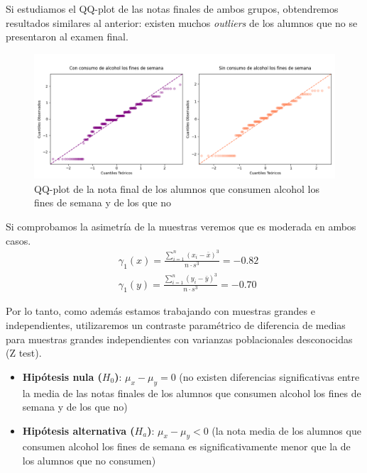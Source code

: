 Si estudiamos el QQ-plot de las notas finales de ambos grupos, obtendremos resultados similares al anterior: existen muchos \textit{outliers} de los alumnos que no se presentaron al examen final.
\begin{figure}[H]
    \begin{center}
        \includegraphics[width=1\textwidth]{figures/qq-plot-walc.png}
    \end{center}
    \caption{QQ-plot de la nota final de los alumnos que consumen alcohol los fines de semana y de los que no}\label{fig:qq-plot-walc}
\end{figure}

Si comprobamos la asimetría de la muestras veremos que es moderada en ambos casos.
\begin{equation*}
    \begin{split}
        & \gamma_{1}(x) = \frac{\sum_{i=1}^{n}(x_i - \bar{x})^3}{n \cdot s^3} = -0.82\\
        & \gamma_{1}(y) = \frac{\sum_{i=1}^{n}(y_i - \bar{y})^3}{n \cdot s^3} = -0.70
    \end{split} 
\end{equation*}

Por lo tanto, como además estamos trabajando con muestras grandes e independientes, utilizaremos un contraste paramétrico de diferencia de medias para muestras grandes independientes con varianzas poblacionales desconocidas (Z test).
\begin{itemize}
    \item \textbf{Hipótesis nula ($H_0$)}: $\mu_x - \mu_y = 0$ (no existen diferencias significativas entre la media de las notas finales de los alumnos que consumen alcohol los fines de semana y de los que no)
    \item \textbf{Hipótesis alternativa ($H_a$)}: $\mu_x - \mu_y < 0$ (la nota media de los alumnos que consumen alcohol los fines de semana es significativamente menor que la de los alumnos que no consumen)
\end{itemize}

